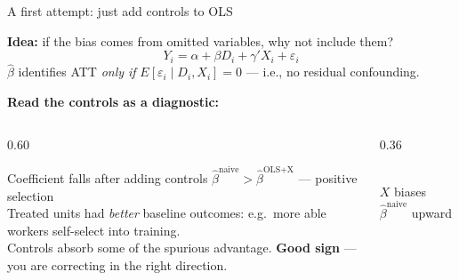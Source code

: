 \documentclass[aspectratio=169, 10pt]{beamer}
\begin{document}
\begin{frame}[shrink=3]{A first attempt: just add controls to OLS}

  \textbf{Idea:} if the bias comes from omitted variables, why not include them?
  \[
    Y_i = \alpha + \beta D_i + \gamma' X_i + \varepsilon_i
  \]
  $\hat\beta$ identifies ATT \emph{only if} $E[\varepsilon_i \mid D_i, X_i] = 0$ — i.e., no residual confounding.

  \medskip
  \textbf{Read the controls as a diagnostic:}

  \begin{overprint}

    \begin{columns}[T]
      \begin{column}{0.60\textwidth}
        \begin{block}{Coefficient falls after adding controls}
          $\hat\beta^{\text{naive}} > \hat\beta^{\text{OLS+X}}$ — positive selection\\[3pt]
          Treated units had \emph{better} baseline outcomes: e.g.\ more able workers self-select into training.\\
          Controls absorb some of the spurious advantage. \textbf{Good sign} — you are correcting in the right direction.
        \end{block}
      \end{column}
      \begin{column}{0.36\textwidth}
        \centering\vspace{4pt}
        \\[3pt]
        {\scriptsize\color{ecred} $X$ biases $\hat\beta^{\text{naive}}$ upward}
      \end{column}
    \end{columns}


\end{overprint}
\end{frame}
\end{document}

